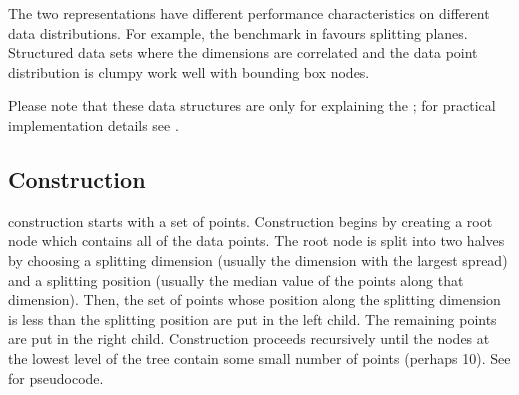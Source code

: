 The two representations have different performance characteristics on
different data distributions.  For example, the benchmark in
 favours splitting planes.  Structured data sets
where the dimensions are correlated and the data point distribution is
clumpy work well with bounding box nodes.


Please note that these data structures are only for explaining the
\kdtree; for practical implementation details see
.



\subsection{Construction}


\Kdtree construction starts with a set of points.  Construction begins by
creating a root node which contains all of the data points.  The root
node is split into two halves by choosing a splitting dimension
(usually the dimension with the largest spread) and a splitting
position (usually the median value of the points along that
dimension).  Then, the set of points whose position along the
splitting dimension is less than the splitting position are put in the
left child.  The remaining points are put in the right child.
Construction proceeds recursively until the nodes at the lowest level
of the tree contain some small number of points (perhaps 10).  See
 for pseudocode.

\clearpage

